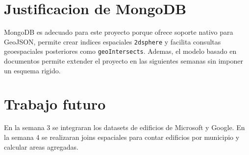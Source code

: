 \documentclass[12pt]{article}
\begin{document}
\section{Justificacion de MongoDB}

MongoDB es adecuado para este proyecto porque ofrece soporte nativo para GeoJSON, permite crear indices espaciales \texttt{2dsphere} y facilita consultas geoespaciales posteriores como \texttt{geoIntersects}. Ademas, el modelo basado en documentos permite extender el proyecto en las siguientes semanas sin imponer un esquema rigido.

\section{Trabajo futuro}

En la semana 3 se integraran los datasets de edificios de Microsoft y Google. En la semana 4 se realizaran joins espaciales para contar edificios por municipio y calcular areas agregadas.
\end{document}
